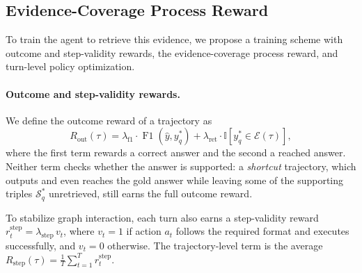 \subsection{Evidence-Coverage Process Reward}
\label{sec:training}

To train the agent to retrieve this evidence, we propose a training scheme with outcome and step-validity rewards, the evidence-coverage process reward, and turn-level policy optimization.

\paragraph{Outcome and step-validity rewards.}
We define the outcome reward of a trajectory as
\begin{equation}
\label{eq:rout}
    R_{\text{out}}(\tau)
    =
    \lambda_{\text{f1}}
    \cdot
    \operatorname{F1}(\hat{y},y_q^{*})
    +
    \lambda_{\text{ret}}
    \cdot
    \mathbb{I}[y_q^{*}\in\mathcal{E}(\tau)],
\end{equation}
where the first term rewards a correct answer and the second a reached answer. Neither term checks whether the answer is supported: a \emph{shortcut} trajectory, which outputs and even reaches the gold answer while leaving some of the supporting triples $\mathcal{S}^{*}_{q}$ unretrieved, still earns the full outcome reward.

To stabilize graph interaction, each turn also earns a step-validity reward $r^{\text{step}}_{t}=\lambda_{\text{step}}\,v_t$, where $v_t=1$ if action $a_t$ follows the required format and executes successfully, and $v_t=0$ otherwise. The trajectory-level term is the average $R_{\text{step}}(\tau)=\frac{1}{T}\sum_{t=1}^{T} r^{\text{step}}_{t}$.

